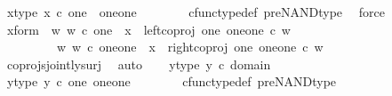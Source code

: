 \begin{isabellebody}
\ x{\isacharunderscore}{\kern0pt}type{\isacharprime}{\kern0pt}{\isacharcolon}{\kern0pt}\ {\isachardoublequoteopen}x\ {\isasymin}\isactrlsub c\ one\ {\isasymCoprod}\ {\isacharparenleft}{\kern0pt}one{\isasymCoprod}one{\isacharparenright}{\kern0pt}{\isachardoublequoteclose}\ \ \isanewline
\ \ \ \ \isamarkupfalse%
\ cfunc{\isacharunderscore}{\kern0pt}type{\isacharunderscore}{\kern0pt}def\ pre{\isacharunderscore}{\kern0pt}NAND{\isacharunderscore}{\kern0pt}type\ \isamarkupfalse%
\ force\isanewline
\ \ \isamarkupfalse%
\ \isamarkupfalse%
\ x{\isacharunderscore}{\kern0pt}form{\isacharcolon}{\kern0pt}\ {\isachardoublequoteopen}{\isacharparenleft}{\kern0pt}{\isasymexists}\ w{\isachardot}{\kern0pt}\ w\ {\isasymin}\isactrlsub c\ one\ {\isasymand}\ x\ {\isacharequal}{\kern0pt}\ left{\isacharunderscore}{\kern0pt}coproj\ one\ {\isacharparenleft}{\kern0pt}one{\isasymCoprod}one{\isacharparenright}{\kern0pt}\ {\isasymcirc}\isactrlsub c\ w{\isacharparenright}{\kern0pt}\isanewline
\ \ \ \ \ \ {\isasymor}\ \ {\isacharparenleft}{\kern0pt}{\isasymexists}\ w{\isachardot}{\kern0pt}\ w\ {\isasymin}\isactrlsub c\ one{\isasymCoprod}one\ {\isasymand}\ x\ {\isacharequal}{\kern0pt}\ right{\isacharunderscore}{\kern0pt}coproj\ one\ {\isacharparenleft}{\kern0pt}one{\isasymCoprod}one{\isacharparenright}{\kern0pt}\ {\isasymcirc}\isactrlsub c\ w{\isacharparenright}{\kern0pt}{\isachardoublequoteclose}\isanewline
\ \ \ \ \isamarkupfalse%
\ coprojs{\isacharunderscore}{\kern0pt}jointly{\isacharunderscore}{\kern0pt}surj\ \isamarkupfalse%
\ auto\isanewline
\isanewline
\ \ \isamarkupfalse%
\ y{\isacharunderscore}{\kern0pt}type{\isacharcolon}{\kern0pt}\ {\isachardoublequoteopen}y\ {\isasymin}\isactrlsub c\ domain\ {\isacharparenleft}{\kern0pt}{\isasymlangle}{\isasymf}{\isacharcomma}{\kern0pt}\ {\isasymf}{\isasymrangle}\ {\isasymamalg}\ {\isasymlangle}{\isasymt}{\isacharcomma}{\kern0pt}{\isasymf}{\isasymrangle}\ {\isasymamalg}\ {\isasymlangle}{\isasymf}{\isacharcomma}{\kern0pt}{\isasymt}{\isasymrangle}{\isacharparenright}{\kern0pt}{\isachardoublequoteclose}\ \isanewline
\ \ \isamarkupfalse%
\ \isamarkupfalse%
\ y{\isacharunderscore}{\kern0pt}type{\isacharprime}{\kern0pt}{\isacharcolon}{\kern0pt}\ {\isachardoublequoteopen}y\ {\isasymin}\isactrlsub c\ one{\isasymCoprod}\ {\isacharparenleft}{\kern0pt}one{\isasymCoprod}one{\isacharparenright}{\kern0pt}{\isachardoublequoteclose}\ \ \isanewline
\ \ \ \ \isamarkupfalse%
\ cfunc{\isacharunderscore}{\kern0pt}type{\isacharunderscore}{\kern0pt}def\ pre{\isacharunderscore}{\kern0pt}NAND{\isacharunderscore}{\kern0pt}type\ \isamarkupfalse%

\end{isabellebody}
